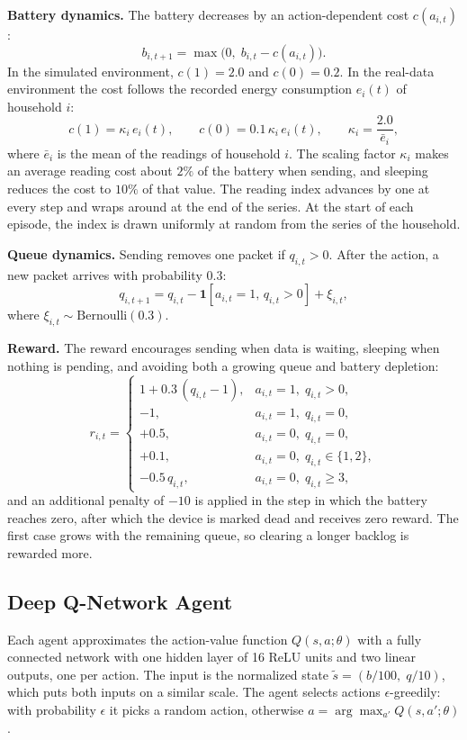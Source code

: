 \documentclass[conference]{IEEEtran}
\begin{document}
\textbf{Battery dynamics.} The battery decreases by an action-dependent cost $c(a_{i,t})$:
\begin{equation}
b_{i,t+1} = \max\bigl(0,\; b_{i,t} - c(a_{i,t})\bigr).
\end{equation}
In the simulated environment, $c(1)=2.0$ and $c(0)=0.2$. In the real-data environment the cost follows the recorded energy consumption $e_i(t)$ of household $i$:
\begin{equation}
c(1) = \kappa_i\, e_i(t), \qquad c(0) = 0.1\,\kappa_i\, e_i(t), \qquad \kappa_i = \frac{2.0}{\bar{e}_i},
\end{equation}
where $\bar{e}_i$ is the mean of the readings of household $i$. The scaling factor $\kappa_i$ makes an average reading cost about $2\%$ of the battery when sending, and sleeping reduces the cost to $10\%$ of that value. The reading index advances by one at every step and wraps around at the end of the series. At the start of each episode, the index is drawn uniformly at random from the series of the household.

\textbf{Queue dynamics.} Sending removes one packet if $q_{i,t}>0$. After the action, a new packet arrives with probability $0.3$:
\begin{equation}
q_{i,t+1} = q_{i,t} - \mathbf{1}[a_{i,t}=1,\, q_{i,t}>0] + \xi_{i,t},
\end{equation}
where $\xi_{i,t}\sim\text{Bernoulli}(0.3)$.

\textbf{Reward.} The reward encourages sending when data is waiting, sleeping when nothing is pending, and avoiding both a growing queue and battery depletion:
\begin{equation}
r_{i,t} =
\begin{cases}
1 + 0.3\,(q_{i,t}-1), & a_{i,t}{=}1,\; q_{i,t}{>}0,\\
-1, & a_{i,t}{=}1,\; q_{i,t}{=}0,\\
+0.5, & a_{i,t}{=}0,\; q_{i,t}{=}0,\\
+0.1, & a_{i,t}{=}0,\; q_{i,t}\in\{1,2\},\\
-0.5\,q_{i,t}, & a_{i,t}{=}0,\; q_{i,t}\ge 3,
\end{cases}
\end{equation}
and an additional penalty of $-10$ is applied in the step in which the battery reaches zero, after which the device is marked dead and receives zero reward. The first case grows with the remaining queue, so clearing a longer backlog is rewarded more.

\subsection{Deep Q-Network Agent}
Each agent approximates the action-value function $Q(s,a;\theta)$ with a fully connected network with one hidden layer of 16 ReLU units and two linear outputs, one per action. The input is the normalized state $\tilde{s}=(b/100,\; q/10)$, which puts both inputs on a similar scale. The agent selects actions $\epsilon$-greedily: with probability $\epsilon$ it picks a random action, otherwise $a=\arg\max_{a'}Q(s,a';\theta)$.
\end{document}
